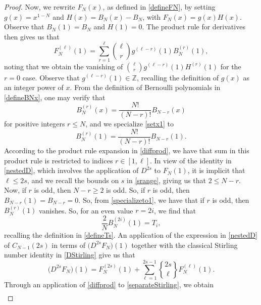 \documentclass[12pt]{article}
\DeclareRobustCommand{\stirling}{\genfrac\{\}{0pt}{}}
\begin{document}
\begin{proof}
 Now, we rewrite $F_{N}(x)$, as defined in \eqref{defineFN}, by setting $g(x) = x^{1-N}$ and $H(x) = B_{N}(x) - B_{N}$, with $F_{N}(x) 
 = g(x) H(x)$. Observe that $B_{N}(1) = B_{N}$ and $H(1) = 0$.
 The product rule for derivatives then gives us that 
\begin{equation}\label{diffprod} 
 F_{N}^{(\ell)}(1) = \sum_{r=1}^{\ell} \binom{\ell}{r} g^{(\ell - r)}(1) B_{N}^{(r)}(1),
\end{equation}
 noting that we obtain the vanishing of $\binom{\ell}{r} g^{(\ell - r)}(1) H^{(r)}(1) $
 for the $r = 0$ case. 
 Observe that $g^{(\ell - r)}(1) \in \mathbb{Z}$, recalling the definition of $g(x)$ as an integer power of $x$. 
 From the definition of Bernoulli polynomials in \eqref{defineBNx}, one may verify that 
\begin{equation}\label{setx1} 
 B_{N}^{(r)}(x) = \frac{N!}{(N-r)!} B_{N - r}(x) 
\end{equation}
 for positive integers $r \leq N$, and we specialize \eqref{setx1} to 
\begin{equation}\label{specializeto1}
 B_{N}^{(r)}(1) = \frac{N!}{(N-r)!} B_{N - r}(1). 
\end{equation}
 According to the product rule expansion in \eqref{diffprod}, we have that sum in this product rule is restricted to indices $r \in [1, 
 \ell]$. In view of the identity in \eqref{nestedD}, which involves the application of $D^{2s}$ to $F_{N}(1)$, it is implicit that $\ell \leq 2 
 s$, and we recall the bounds on $s$ in \eqref{srange}, giving us that $2 \leq N - r$. Now, if $r$ is odd, then $N - r \geq 2$ is odd. 
 So, if $r$ is odd, then $B_{N-r}(1) = B_{N-r} = 0$. So, from \eqref{specializeto1}, we have that if $r$ is odd, 
 then $B_{N}^{(r)}(1)$ vanishes. 
 So, for an even value $r = 2i$, 
 we find that 
\begin{equation}\label{BntoT} 
 \frac{2}{N} B_{N}^{(2i)}(1) = T_{i}, 
\end{equation}
 recalling the definition in \eqref{defineTs}. An application of 
 the expression in \eqref{nestedD} of $C_{N-1}(2s)$ in terms of $\big( D^{2s}F_{N} \big)(1)$ 
 together with 
 the classical Stirling number identity in \eqref{DStirling}
 give  us that 
\begin{equation}\label{separateStirling} 
 \big( D^{2s} F_{N} \big)(1) = F_{N}^{(2s)}(1)
 + \sum_{\ell = 1}^{2s-1} \stirling{2s}{\ell} F_{N}^{(\ell)}(1). 
\end{equation}
 Through an application of \eqref{diffprod} to \eqref{separateStirling}, we obtain 
\begin{multline*}

\end{multline*}
\end{proof}
\end{document}
